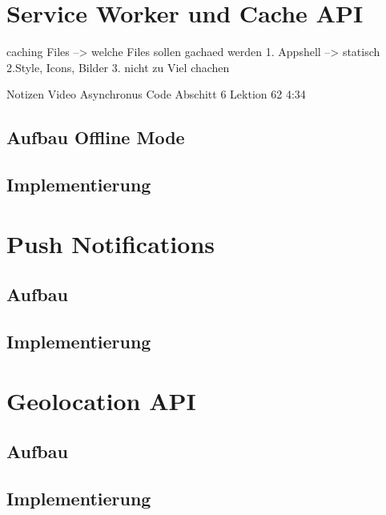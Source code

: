 \section{Service Worker und Cache API}


caching Files --> welche Files sollen gachaed werden
	1. Appshell --> statisch
		2.Style, Icons, Bilder
		3. nicht zu Viel chachen
		
		
Notizen Video
	Asynchronus Code Abschitt 6 Lektion 62 4:34 
	 

\subsection{Aufbau Offline Mode}
\subsection{Implementierung}

\section{Push Notifications}
\subsection{Aufbau}
\subsection{Implementierung}

\section{Geolocation API}
\subsection{Aufbau}
\subsection{Implementierung}










